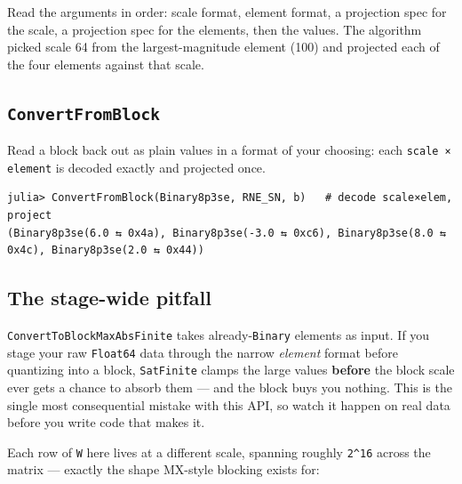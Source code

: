 Read the arguments in order: scale format, element format, a projection spec for the scale, a projection spec for the elements, then the values. The algorithm picked scale 64 from the largest-magnitude element (100) and projected each of the four elements against that scale.



\subsection{\texttt{ConvertFromBlock}}



\label{15940086769284149764}{}


Read a block back out as plain values in a format of your choosing: each \texttt{scale × element} is decoded exactly and projected once.




\begin{verbatim}
julia> ConvertFromBlock(Binary8p3se, RNE_SN, b)   # decode scale×elem, project
(Binary8p3se(6.0 ⇆ 0x4a), Binary8p3se(-3.0 ⇆ 0xc6), Binary8p3se(8.0 ⇆ 0x4c), Binary8p3se(2.0 ⇆ 0x44))
\end{verbatim}



\subsection{The stage-wide pitfall}



\label{13625156544789482334}{}


\texttt{ConvertToBlockMaxAbsFinite} takes already-\texttt{Binary} elements as input. If you stage your raw \texttt{Float64} data through the narrow \emph{element} format before quantizing into a block, \texttt{SatFinite} clamps the large values \textbf{before} the block scale ever gets a chance to absorb them — and the block buys you nothing. This is the single most consequential mistake with this API, so watch it happen on real data before you write code that makes it.



Each row of \texttt{W} here lives at a different scale, spanning roughly \texttt{2{\textasciicircum}16} across the matrix — exactly the shape MX-style blocking exists for:




